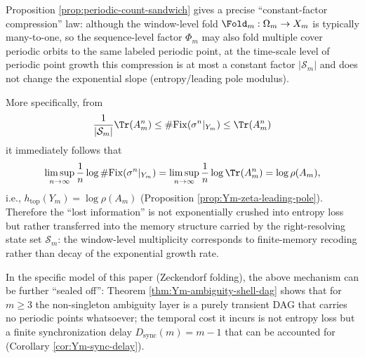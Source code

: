 \begin{remark}\label{rem:Ym-no-entropy-loss-mechanism}
Proposition \ref{prop:periodic-count-sandwich} gives a precise ``constant-factor compression'' law: although the window-level fold \(\Fold_m:\Omega_m\to X_m\) is typically many-to-one, so the sequence-level factor \(\Phi_m\) may also fold multiple cover periodic orbits to the same labeled periodic point, at the time-scale level of periodic point growth this compression is at most a constant factor \(|\mathcal{S}_m|\) and does not change the exponential slope (entropy/leading pole modulus).

More specifically, from
\[
\frac{1}{|\mathcal{S}_m|}\Tr(A_m^n)\le \#\mathrm{Fix}(\sigma^n|_{Y_m})\le \Tr(A_m^n)
\]
it immediately follows that
\[
\limsup_{n\to\infty}\frac{1}{n}\log\#\mathrm{Fix}(\sigma^n|_{Y_m})
=\limsup_{n\to\infty}\frac{1}{n}\log\Tr(A_m^n)
=\log\rho(A_m),
\]
i.e., \(h_{\mathrm{top}}(Y_m)=\log\rho(A_m)\) (Proposition \ref{prop:Ym-zeta-leading-pole}).
Therefore the ``lost information'' is not exponentially crushed into entropy loss but rather transferred into the memory structure carried by the right-resolving state set \(\mathcal{S}_m\): the window-level multiplicity corresponds to finite-memory recoding rather than decay of the exponential growth rate.

In the specific model of this paper (Zeckendorf folding), the above mechanism can be further ``sealed off'': Theorem \ref{thm:Ym-ambiguity-shell-dag} shows that for $m\ge 3$ the non-singleton ambiguity layer is a purely transient DAG that carries no periodic points whatsoever; the temporal cost it incurs is not entropy loss but a finite synchronization delay \(D_{\mathrm{sync}}(m)=m-1\) that can be accounted for (Corollary \ref{cor:Ym-sync-delay}).
\end{remark}

